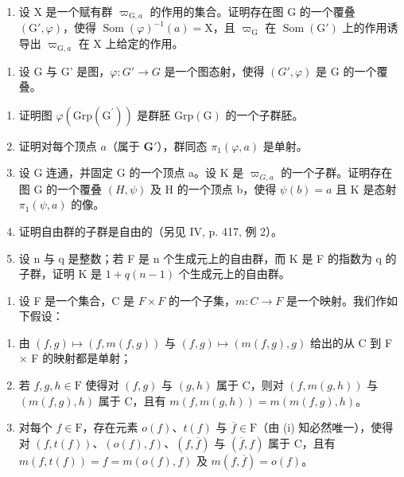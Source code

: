 \begin{enumerate}
\def\labelenumi{\alph{enumi})}
\setcounter{enumi}{1}
\tightlist
\item
  设 X 是一个赋有群 \(\varpi_{\mathrm{G},a}\) 的作用的集合。证明存在图 G 的一个覆叠 \((\mathrm{G}',\varphi)\)，使得 \(\operatorname{Som}(\varphi)^{-1}(a) = \mathrm{X}\)，且 \(\varpi_{\mathrm{G}}\) 在 \(\operatorname{Som}(\mathrm{G}')\) 上的作用诱导出 \(\varpi_{\mathrm{G},a}\) 在 X 上给定的作用。
\end{enumerate}

\begin{enumerate}
\def\labelenumi{\arabic{enumi})}
\setcounter{enumi}{8}
\tightlist
\item
  设 G 与 G' 是图，\(\varphi\colon G'\to G\) 是一个图态射，使得 \((G',\varphi)\) 是 G 的一个覆叠。
\end{enumerate}

\begin{enumerate}
\def\labelenumi{\alph{enumi})}
\item
  证明图 \(\varphi(\mathrm{Grp}(\mathrm{G}^{\prime}))\) 是群胚 \(\mathrm{Grp}(\mathrm{G})\) 的一个子群胚。
\item
  证明对每个顶点 \(a\)（属于 \(\mathbf{G}'\)），群同态 \(\pi_1(\varphi, a)\) 是单射。
\item
  设 G 连通，并固定 G 的一个顶点 a。设 K 是 \(\varpi_{G,a}\) 的一个子群。证明存在图 G 的一个覆叠 \((H,\psi)\) 及 H 的一个顶点 b，使得 \(\psi(b)=a\) 且 K 是态射 \(\pi_{1}(\psi,a)\) 的像。
\item
  证明自由群的子群是自由的（另见 IV, p. 417, 例 2）。
\item
  设 n 与 q 是整数；若 F 是 n 个生成元上的自由群，而 K 是 F 的指数为 q 的子群，证明 K 是 \(1 + q(n - 1)\) 个生成元上的自由群。
\end{enumerate}

\begin{enumerate}
\def\labelenumi{\arabic{enumi})}
\setcounter{enumi}{9}
\tightlist
\item
  设 F 是一个集合，C 是 \(F \times F\) 的一个子集，\(m: C \to F\) 是一个映射。我们作如下假设：
\end{enumerate}

\begin{enumerate}
\def\labelenumi{(\roman{enumi})}
\item
  由 \((f,g)\mapsto(f,m(f,g))\) 与 \((f,g)\mapsto(m(f,g),g)\) 给出的从 C 到 F × F 的映射都是单射；
\item
  若 \(f, g, h \in \mathrm{F}\) 使得对 \((f, g)\) 与 \((g, h)\) 属于 C，则对 \((f, m(g, h))\) 与 \((m(f, g), h)\) 属于 C，且有 \(m(f, m(g, h)) = m(m(f, g), h)\)。
\item
  对每个 \(f \in \mathrm{F}\)，存在元素 \(o(f)\)、\(t(f)\) 与 \(\overline{f} \in \mathrm{F}\)（由 (i) 知必然唯一），使得对 \((f, t(f))\)、\((o(f), f)\)、\((f, \overline{f})\) 与 \((\overline{f}, f)\) 属于 C，且有 \(m(f, t(f)) = f = m(o(f), f)\) 及 \(m(f, \overline{f}) = o(f)\)。
\end{enumerate}

